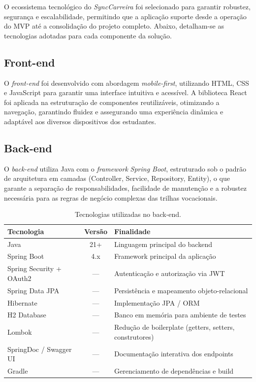 O ecossistema tecnológico do \textit{SyncCarreira} foi selecionado para garantir robustez, segurança e escalabilidade, permitindo que a aplicação suporte desde a operação do MVP até a consolidação do projeto completo. Abaixo, detalham-se as tecnologias adotadas para cada componente da solução.

\subsection{Front-end}

O \textit{front-end} foi desenvolvido com abordagem \textit{mobile-first}, utilizando HTML, CSS e JavaScript para garantir uma interface intuitiva e acessível. A biblioteca React foi aplicada na estruturação de componentes reutilizáveis, otimizando a navegação, garantindo fluidez e assegurando uma experiência dinâmica e adaptável aos diversos dispositivos dos estudantes.

\subsection{Back-end}

O \textit{back-end} utiliza Java com o \textit{framework} \textit{Spring Boot}, estruturado sob o padrão de arquitetura em camadas (Controller, Service, Repository, Entity), o que garante a separação de responsabilidades, facilidade de manutenção e a robustez necessária para as regras de negócio complexas das trilhas vocacionais.

\begin{table}[H]
\centering
\ABNTEXfontereduzida
\caption[Tecnologias utilizadas no back-end.]{Tecnologias utilizadas no back-end.}
\label{tab-tecnologias-backend}
\begin{tabular}{p{4.5cm}|c|p{7.5cm}}
\textbf{Tecnologia} & \textbf{Versão} & \textbf{Finalidade} \\
\hline
Java & 21+ & Linguagem principal do backend \\
\hline
Spring Boot & 4.x & Framework principal da aplicação \\
\hline
Spring Security + OAuth2 & --- & Autenticação e autorização via JWT \\
\hline
Spring Data JPA & --- & Persistência e mapeamento objeto-relacional \\
\hline
Hibernate & --- & Implementação JPA / ORM \\
\hline
H2 Database & --- & Banco em memória para ambiente de testes \\
\hline
Lombok & --- & Redução de boilerplate (getters, setters, construtores) \\
\hline
SpringDoc / Swagger UI & --- & Documentação interativa dos endpoints \\
\hline
Gradle & --- & Gerenciamento de dependências e build \\
\hline
\end{tabular}
\end{table}

